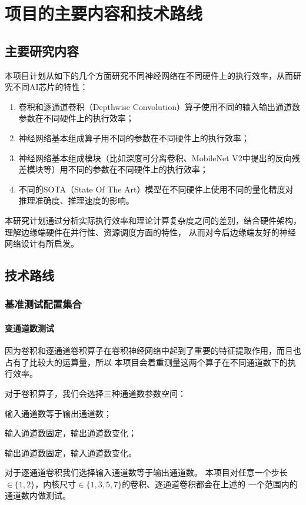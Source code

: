 \section{项目的主要内容和技术路线}

\subsection{主要研究内容}
本项目计划从如下的几个方面研究不同神经网络在不同硬件上的执行效率，从而研究不同AI芯片的特性：
\begin{enumerate}
    \item 卷积和逐通道卷积（Depthwise Convolution）算子使用不同的输入输出通道数参数在不同硬件上的执行效率；
    \item 神经网络基本组成算子用不同的参数在不同硬件上的执行效率；
    \item 神经网络基本组成模块（比如深度可分离卷积、MobileNet V2中提出的反向残差模块等）用不同的参数在不同硬件上的执行效率；
    \item 不同的SOTA（State Of The Art）模型在不同硬件上使用不同的量化精度对推理准确度、推理速度的影响。
\end{enumerate}

本研究计划通过分析实际执行效率和理论计算复杂度之间的差别，结合硬件架构，理解边缘端硬件在并行性、资源调度方面的特性，
从而对今后边缘端友好的神经网络设计有所启发。

\subsection{技术路线}

\subsubsection{基准测试配置集合}

\paragraph{变通道数测试}
因为卷积和逐通道卷积算子在卷积神经网络中起到了重要的特征提取作用，而且也占有了比较大的运算量，所以
本项目会着重测量这两个算子在不同通道数下的执行效率。

对于卷积算子，我们会选择三种通道数参数空间：
\begin{enumerate*}
    \item 输入通道数等于输出通道数；
    \item 输入通道数固定，输出通道数变化；
    \item 输出通道数固定，输入通道数变化。
\end{enumerate*}
对于逐通道卷积我们选择输入通道数等于输出通道数。
本项目对任意一个步长$\in \{1,2\}$，内核尺寸$\in \{1,3,5,7\}$的卷积、逐通道卷积都会在上述的
一个范围内的通道数内做测试。


